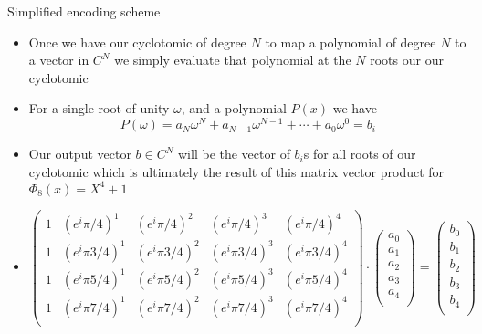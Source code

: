 \documentclass{beamer}
\begin{document}
\begin{frame}{Simplified encoding scheme}
	\begin{itemize}[<+->]
		\item Once we have our cyclotomic of degree $N$ to map a polynomial of degree $N$ to
		a vector in $C^N$ we simply evaluate that polynomial at the $N$ roots our our cyclotomic
		\item For a single root of unity $\omega$, and a polynomial $P(x)$ we have
		 $$P(\omega) = a_N\omega^N + a_{N-1}\omega^{N-1} + \cdots + a_0\omega^0 = b_i$$
		\item Our output vector $b \in C^N$ will be the vector of $b_i$s for all roots of our cyclotomic
		which is ultimately the result of this matrix vector product for $\Phi_8(x) = X^4 + 1$
		\item 
		\begin{center}
			\[
			\begin{pmatrix}
				1 & (e^i\pi/4)^1 &  (e^i\pi/4)^2 &  (e^i\pi/4)^3 & (e^i\pi/4)^4\\  
				1 & (e^i\pi 3/4)^1 &  (e^i\pi 3/4)^2 &  (e^i\pi 3/4)^3 & (e^i\pi 3/4)^4\\  
				1 & (e^i\pi 5/4)^1 &  (e^i\pi 5/4)^2 &  (e^i\pi 5/4)^3 & (e^i\pi 5/4)^4\\  
				1 & (e^i\pi 7/4)^1 &  (e^i\pi 7/4)^2 &  (e^i\pi 7/4)^3 & (e^i\pi 7/4)^4\\  
			\end{pmatrix} \cdot 
			\begin{pmatrix}
				a_0\\
				a_1\\
				a_2\\
				a_3\\
				a_4\\
			\end{pmatrix} =
			\begin{pmatrix}
				b_0\\
				b_1\\
				b_2\\
				b_3\\
				b_4\\
			\end{pmatrix}
			\]
		\end{center}
	\end{itemize}
\end{frame}
\end{document}
